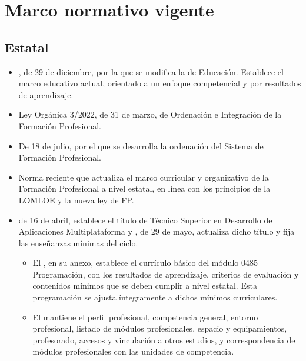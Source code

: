  
 \section*{Marco normativo vigente}
 \label{sec:marco-normativo}
 
 \subsection*{Estatal}
 \label{sec:normativa-estatal}

 \begin{itemize}
     \item \label{ley:lomloe_l}\label{ley:lomloe_l}, de 29 de diciembre, por la que se modifica la \label{ley:loe_l} de Educación.  Establece el marco educativo actual, orientado a un enfoque competencial y por resultados de aprendizaje.
 
     \item \label{ley:nueva-fp_l} Ley Orgánica 3/2022, de 31 de marzo, de Ordenación e Integración de la Formación Profesional.
 
     \item \label{rd:659-2023_l} De 18 de julio, por el que se desarrolla la ordenación del Sistema de Formación Profesional.
 
     \item \label{rd:500-2024_l} Norma reciente que actualiza el marco curricular y organizativo de la Formación Profesional a nivel estatal, en línea con los principios de la LOMLOE y la nueva ley de FP.
 
     \item  \label{rd:450-2010_l} de 16 de abril, establece el título de Técnico Superior en Desarrollo de Aplicaciones Multiplataforma 
     y
     \label{rd:405-2023_l}, de 29 de mayo, actualiza dicho título y fija las enseñanzas mínimas del ciclo.
     \begin{itemize}
         \item El  , en su anexo, establece el currículo básico del módulo 0485 Programación, con los resultados de aprendizaje, criterios de evaluación y contenidos mínimos que se deben cumplir a nivel estatal. Esta programación se ajusta íntegramente a dichos mínimos curriculares.
         \item El  mantiene el perfil profesional, competencia general, entorno profesional, listado de módulos profesionales, espacio y equipamientos, profesorado, accesos y vinculación a otros estudios, y correspondencia de módulos profesionales con las unidades de competencia.
     \end{itemize}
 \end{itemize}
 
